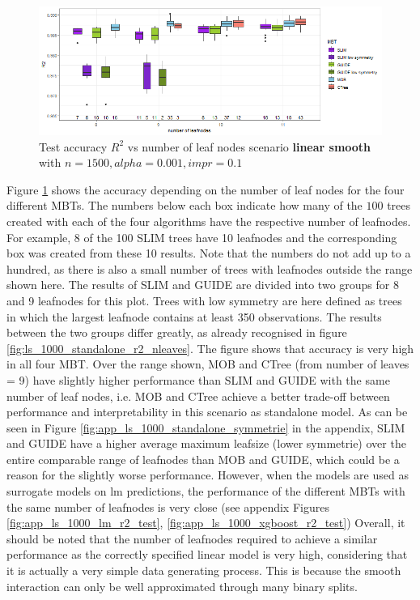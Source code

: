 \begin{figure}[!htb] 
\centering
    \includegraphics[width=16cm]{Figures/simulations/batchtools/basic_scenarios/linear_smooth/ls_1000_standalone_r2_test.png}
    \caption{Test accuracy $R^2$ vs number of leaf nodes scenario \textbf{linear smooth} with $n=1500, alpha = 0.001, impr = 0.1$}
    \label{fig:ls_1000_standalone_r2_test}
\end{figure} 

Figure \ref{fig:ls_1000_standalone_r2_test} shows the accuracy depending on the number of leaf nodes for the four different MBTs.
The numbers below each box indicate how many of the $100$ trees created with each of the four algorithms have the respective number of leafnodes. For example, 8 of the 100 SLIM trees have 10 leafnodes and the corresponding box was created from these 10 results. Note that the numbers do not add up to a hundred, as there is also a small number of trees with leafnodes outside the range shown here. The results of SLIM and GUIDE are divided into two groups for 8 and 9 leafnodes for this plot. Trees with low symmetry are here defined as trees in which the largest leafnode contains at least 350 observations. The results between the two groups differ greatly, as already recognised in figure \ref{fig:ls_1000_standalone_r2_nleaves}.
The figure shows that accuracy is very high in all four MBT. Over the range shown, MOB and CTree (from number of leaves = 9) have slightly higher performance than SLIM and GUIDE with the same number of leaf nodes, i.e. MOB and CTree achieve a better trade-off between performance and interpretability in this scenario as standalone model.
As can be seen in Figure \ref{fig:app_ls_1000_standalone_symmetrie} in the appendix, SLIM and GUIDE have a higher average maximum leafsize (lower symmetrie) over the entire comparable range of leafnodes than MOB and GUIDE, which could be a reason for the slightly worse performance.
However, when the models are used as surrogate models on lm predictions, the performance of the different MBTs with the same number of leafnodes is very close (see appendix Figures \ref{fig:app_ls_1000_lm_r2_test}, \ref{fig:app_ls_1000_xgboost_r2_test})
Overall, it should  be noted that the number of leafnodes required to achieve a similar performance as the correctly specified linear model is very high, considering that it is actually a very simple data generating process. This is because the smooth interaction can only be well approximated through many binary splits. 






